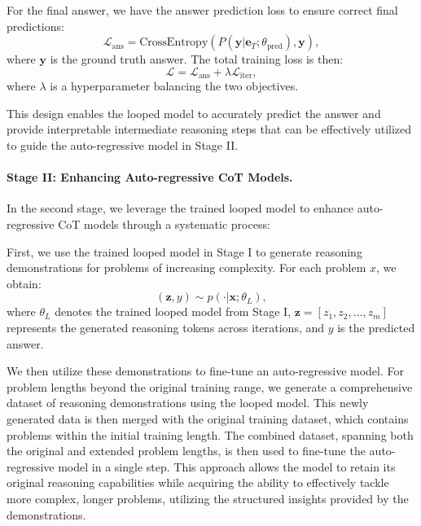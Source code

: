 For the final answer, we have the answer prediction loss to ensure correct final predictions:
\begin{equation}
\mathcal{L}_{\text{ans}} = \text{CrossEntropy}(P(\bm{y}|\bm{e}_T;\theta_{\text{pred}}), \bm{y}),
\end{equation}
where $\bm{y}$ is the ground truth answer.
The total training loss is then:
\begin{equation}
\mathcal{L} = \mathcal{L}_{\text{ans}} + \lambda\mathcal{L}_{\text{iter}},
\end{equation}
where $\lambda$ is a hyperparameter balancing the two objectives.

This design enables the looped model to accurately predict the answer and provide interpretable intermediate reasoning steps that can be effectively utilized to guide the auto-regressive model in Stage II.

\paragraph{Stage II: Enhancing Auto-regressive CoT Models.}
In the second stage, we leverage the trained looped model to enhance auto-regressive CoT models through a systematic process:

First, we use the trained looped model in Stage I to generate reasoning demonstrations for problems of increasing complexity. For each problem $x$, we obtain:
\begin{equation}
(\bm{z}, y) \sim p(\cdot|\bm{x};\theta_L),
\end{equation}
where $\theta_L$ denotes the trained looped model from Stage I, $\bm{z} = [z_1, z_2, \ldots, z_m]$ represents the generated reasoning tokens across iterations, and $y$ is the predicted answer.



We then utilize these demonstrations to fine-tune an auto-regressive model. For problem lengths beyond the original training range, we generate a comprehensive dataset of reasoning demonstrations using the looped model. This newly generated data is then merged with the original training dataset, which contains problems within the initial training length. The combined dataset, spanning both the original and extended problem lengths, is then used to fine-tune the auto-regressive model in a single step. This approach allows the model to retain its original reasoning capabilities while acquiring the ability to effectively tackle more complex, longer problems, utilizing the structured insights provided by the demonstrations.

